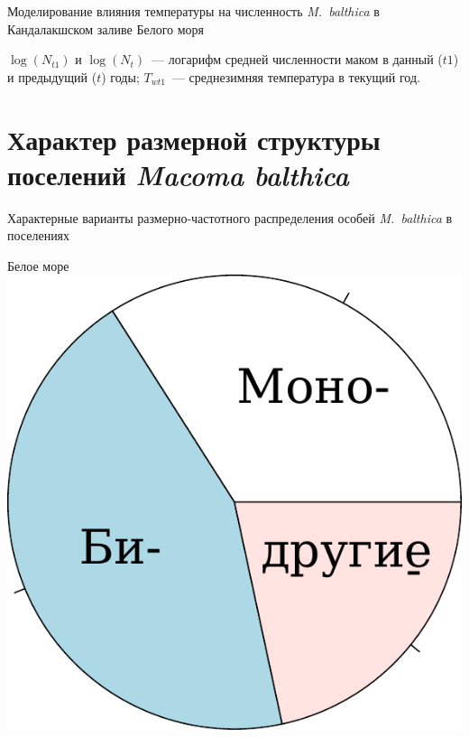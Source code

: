 \documentclass{beamer}
\begin{document}
\begin{frame}{Моделирование влияния температуры на численность {\it M.~balthica} в Кандалакшском заливе Белого моря}
\begin{minipage}[t]{.49\linewidth}
\begin{center}
		\end{center}
	\end{minipage}
{\tiny $\log(N_{t1})$ и $\log(N_{t})$~--- логарифм средней численности маком в данный ($t1$) и предыдущий ($t$) годы; $T_{wt1}$~--- среднезимняя температура в текущий год.}
\end{frame}

		\section[Размерная структура]{Характер размерной структуры поселений {\it Macoma balthica}}

\begin{frame}{Характерные варианты размерно-частотного распределения особей {\it M.~balthica} в поселениях}
	\begin{minipage}[t]{.48\linewidth}
		\begin{center}
{\footnotesize Белое море}\\
			\includegraphics[height=.2\textheight]{White_freq_types.pdf}
		\end{center}
	\end{minipage}
%
	\begin{minipage}[t]{.48\linewidth}
		\begin{center}

\end{center}
\end{minipage}
\end{frame}
\end{document}
